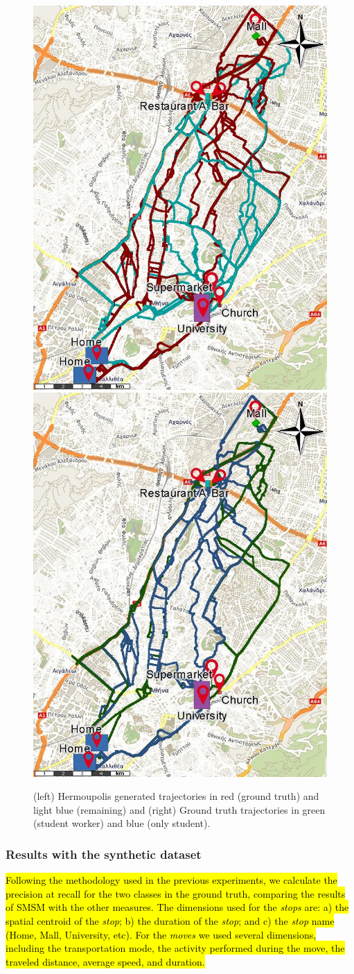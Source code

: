 \documentclass[12pt]{article}
\begin{document}
\begin{figure}[ht!]
\centerline{
\centering
\includegraphics[width=.5\textwidth]{Images/Hermoupolis-RawPoints.jpg}
\includegraphics[width=.5\textwidth]{Images/Hermoupolis-CommercialCenter.jpg}
}
\caption{(left) Hermoupolis generated trajectories in red (ground truth) and light blue (remaining) and (right) Ground truth trajectories in green (student worker) and blue (only student).}
\label{fig:hermoupolis_groundtruth}
\end{figure}

\subsubsection{Results with the synthetic dataset}
\hl{Following the methodology used in the previous experiments, we calculate the precision at recall for the two classes in the ground truth, comparing the results of SMSM with the other measures. The dimensions used for the \emph{stops} are: a) the spatial centroid of the \emph{stop}; b) the duration of the \emph{stop}; and c) the \emph{stop} name (Home, Mall, University, etc). For the \emph{moves} we used several dimensions, including  the transportation mode, the activity performed during the move, the traveled distance, average speed, and duration.}
\end{document}
